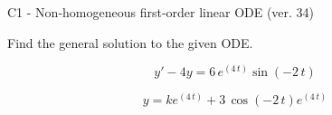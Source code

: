 \begin{exercise}
  \begin{exerciseTitle}C1 - Non-homogeneous first-order linear ODE (ver. 34)\end{exerciseTitle}
  \begin{exerciseStatement}
    
Find the general solution to the given ODE.

    
\[y'-4y= 6 \, e^{\left(4 \, t\right)} \sin\left(-2 \, t\right)\]

  \end{exerciseStatement}
  \begin{exerciseAnswer}
    
\[y= k e^{\left(4 \, t\right)} + 3 \, \cos\left(-2 \, t\right) e^{\left(4 \, t\right)}\]

  \end{exerciseAnswer}
\end{exercise}